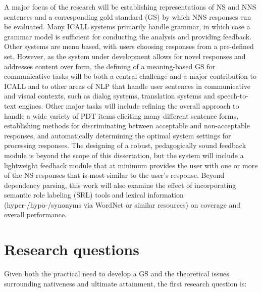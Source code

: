 

\par A major focus of the research will be establishing representations of NS and NNS sentences and a corresponding gold standard (GS) by which NNS responses can be evaluated. Many ICALL systems primarily handle grammar, in which case a grammar model is sufficient for conducting the analysis and providing feedback. Other systems are menu based, with users choosing responses from a pre-defined set. However, as the system under development allows for novel responses and addresses content over form, the defining of a meaning-based GS for communicative tasks will be both a central challenge and a major contribution to ICALL and to other areas of NLP that handle user sentences in communicative and visual contexts, such as dialog systems, translation systems and speech-to-text engines. Other major tasks will include refining the overall approach to handle a wide variety of PDT items eliciting many different sentence forms, establishing methods for discriminating between acceptable and non-acceptable responses, and automatically determining the optimal system settings for processing responses. The designing of a robust, pedagogically sound feedback module is beyond the scope of this dissertation, but the system will include a lightweight feedback module that at minimum provides the user with one or more of the NS responses that is most similar to the user's response. Beyond dependency parsing, this work will also examine the effect of incorporating semantic role labeling (SRL) tools and lexical information (hyper-/hypo-/synonyms via WordNet or similar resources) on coverage and overall performance.\\

\section{Research questions}
Given both the practical need to develop a GS and the theoretical issues surrounding nativeness and ultimate attainment, the first research question is:


